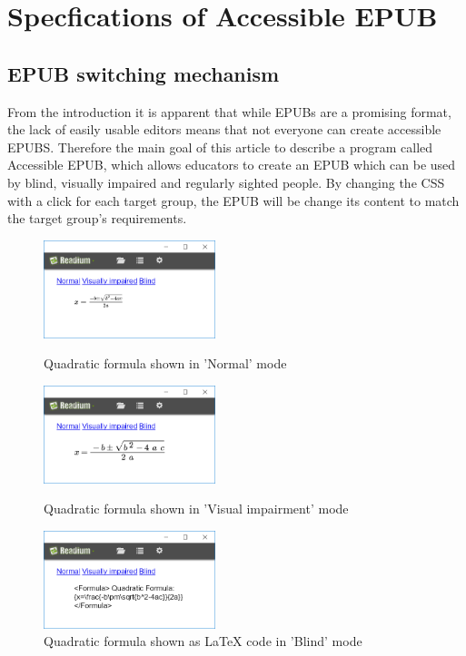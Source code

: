 \documentclass{llncs}
\begin{document}
\section{Specfications of Accessible EPUB}

\subsection{EPUB switching mechanism}

From the introduction it is apparent that while EPUBs are a promising format, the lack of easily usable editors means that not everyone can create accessible EPUBS.
Therefore the main goal of this article to describe a program called Accessible EPUB, which allows educators to create an EPUB which can be used by blind, visually impaired and regularly sighted people. By changing the CSS with a click for each target group, the EPUB will be change its content to match the target group's requirements. 



\begin{figure}
	\centering
	\begin{minipage}{0.45\textwidth}
		\centering
			\includegraphics[width=50mm]{EquationNo.png} 
		\caption{Quadratic formula shown in 'Normal' mode}
	\end{minipage}\hfill
	\begin{minipage}{0.45\textwidth}
		\centering
		\includegraphics[width=50mm]{EquationVi.png} 
		\caption{Quadratic formula shown in 'Visual impairment' mode}
	\end{minipage}\hfill
	\begin{minipage}{0.45\textwidth}
		\centering
			\includegraphics[width=50mm]{EquationBl.png} 
		\caption{Quadratic formula shown as LaTeX code in 'Blind' mode}
	\end{minipage}

\end{figure}
\end{document}

